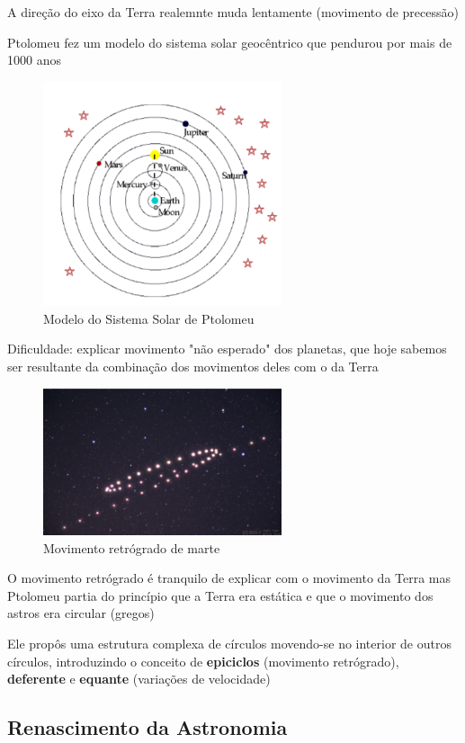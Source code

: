 \documentclass{article}
\begin{document}
A direção do eixo da Terra realemnte muda lentamente (movimento de 
precessão)

Ptolomeu fez um modelo do sistema solar geocêntrico que pendurou 
por mais de 1000 anos


\begin{figure}[H]
    \centering
    \includegraphics[width=7cm]{imagens/modelo_ptolom.png}
    \caption{Modelo do Sistema Solar de Ptolomeu}
\end{figure}

Dificuldade: explicar movimento "não esperado" dos planetas, que 
hoje sabemos ser resultante da combinação dos movimentos deles com o 
da Terra 

\begin{figure}[H]
    \centering
    \includegraphics[width=7cm]{imagens/mov_marte.png}
    \caption{Movimento retrógrado de marte}
\end{figure}

O movimento retrógrado é tranquilo de explicar com o movimento da Terra
mas Ptolomeu partia do princípio que a Terra era estática e que o 
movimento dos astros era circular (gregos)

Ele propôs uma estrutura complexa de círculos movendo-se no interior
de outros círculos, introduzindo o conceito de \textbf{epiciclos} (movimento 
retrógrado), \textbf{deferente} e \textbf{equante} (variações de 
velocidade)

\subsection{Renascimento da Astronomia}
\end{document}
